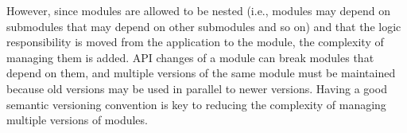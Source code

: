 \documentclass[a4paper,11pt]{kth-mag}
\begin{document}
        However, since modules are allowed to be nested (i.e., modules may depend on submodules that may depend on other submodules and so on) and that the logic responsibility is moved from the application to the module, the complexity of managing them is added.
        \gls{API} changes of a module can break modules that depend on them, and multiple versions of the same module must be maintained because old versions may be used in parallel to newer versions.
        Having a good semantic versioning convention is key to reducing the complexity of managing multiple versions of modules.

    
\end{document}
